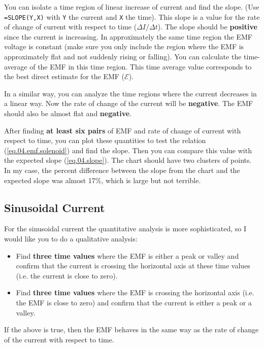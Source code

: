 You can isolate a time region of linear increase of current and find the slope. (Use \texttt{=SLOPE(Y,X)} with \texttt{Y} the current and \texttt{X} the time). This slope is a value for the rate of change of current with respect to time ($\Delta I / \Delta t$). The slope should be \textbf{positive} since the current is increasing. In approximately the same time region the EMF voltage is constant (make sure you only include the region where the EMF is approximately flat and not suddenly rising or falling). You can calculate the time-average of the EMF in this time region. This time average value corresponds to the best direct estimate for the EMF ($\mathcal{E}$).

In a similar way, you can analyze the time regions where the current decreases in a linear way. Now the rate of change of the current will be \textbf{negative}. The EMF should also be almost flat and \textbf{negative}.

After finding \textbf{at least six pairs} of EMF and rate of change of current with respect to time, you can plot these quantities to test the relation (\ref{eq.04.emf.solenoid}) and find the slope. Then you can compare this value with the expected slope (\ref{eq.04.slope}). The chart should have two clusters of points. In my case, the percent difference between the slope from the chart and the expected slope was almost 17\%, which is large but not terrible.
\subsection{Sinusoidal Current}
For the sinusoidal current the quantitative analysis is more sophisticated, so I would like you to do a qualitative analysis:
\begin{itemize}
	\item Find \textbf{three time values} where the EMF is either a peak or valley and confirm that the current is crossing the horizontal axis at these time values (i.e. the current is close to zero).
	\item Find \textbf{three time values} where the EMF is crossing the horizontal axis (i.e. the EMF is close to zero) and confirm that the current is either a peak or a valley.
\end{itemize}
If the above is true, then the EMF behaves in the same way as the rate of change of the current with respect to time.
